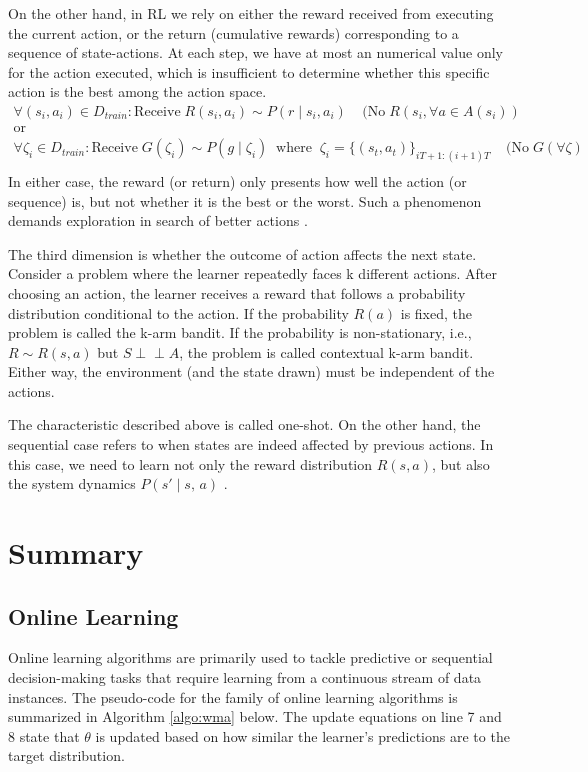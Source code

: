 \documentclass[11pt]{article}
\newcommand{\indep}{\perp \!\!\! \perp}
\begin{document}
On the other hand, in RL we rely on either the reward received from executing the current action, or the return (cumulative rewards) corresponding to a sequence of state-actions. At each step, we have at most an numerical value only for the action executed, which is insufficient to determine whether this specific action is the best among the action space.
\begin{equation}
    \begin{matrix*}
    \forall (s_i,a_i)\in D_{train}: \mathrm{Receive\;} R(s_i,a_i) \sim P(r\;|\;s_i,a_i) \;\;\;\; (\mathrm{No}\;R(s_i,\forall a\in A(s_i))\\
    \mathrm{or}\\
    \forall \zeta_i \in D_{train}: \mathrm{Receive\;} G(\zeta_i) \sim P(g\;|\;\zeta_i) \;\; \mathrm{where} \;\; \zeta_i = \{(s_t,a_t)\}_{iT+1:(i+1)T}\;\;\;\; (\mathrm{No}\;G(\forall \zeta)\\
    \end{matrix*}
\end{equation}
In either case, the reward (or return) only presents how well the action (or sequence) is, but not whether it is the best or the worst. Such a phenomenon demands exploration in search of better actions \cite{sutton_reinforcement_1998}.

The third dimension is whether the outcome of action affects the next state. Consider a problem where the learner repeatedly faces k different actions. After choosing an action, the learner receives a reward that follows a probability distribution conditional to the action. If the probability $R(a)$ is fixed, the problem is called the k-arm bandit. If the probability is non-stationary, i.e., $R\sim R(s,a)$ but $S\indep A$, the problem is called contextual k-arm bandit. Either way, the environment (and the state drawn) must be independent of the actions.

The characteristic described above is called one-shot. On the other hand, the sequential case refers to when states are indeed affected by previous actions. In this case, we need to learn not only the reward distribution $R(s,a)$, but also the system dynamics $P(s'\;|\;s,\,a)$ \cite{sutton_reinforcement_1998}.

\section{Summary}

\subsection{Online Learning}
\normalfont
Online learning algorithms are primarily used to tackle predictive or sequential decision-making tasks that require learning from a continuous stream of data instances. The pseudo-code for the family of online learning algorithms is summarized in Algorithm \ref{algo:wma} below. The update equations on line 7 and 8 state that $\theta$ is updated based on how similar the learner's predictions are to the target distribution.
\end{document}
